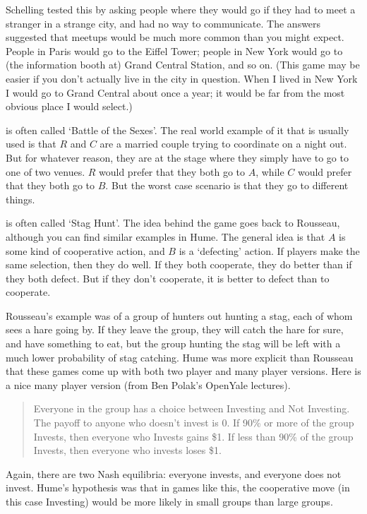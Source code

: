 Schelling tested this by asking people where they would go if they had to meet a stranger in a strange city, and had no way to communicate. The answers suggested that meetups would be much more common than you might expect. People in Paris would go to the Eiffel Tower; people in New York would go to (the information booth at) Grand Central Station, and so on. (This game may be easier if you don't actually live in the city in question. When I lived in New York I would go to Grand Central about once a year; it would be far from the most obvious place I would select.)

 is often called `Battle of the Sexes'. The real world example of it that is usually used is that $R$ and $C$ are a married couple trying to coordinate on a night out. But for whatever reason, they are at the stage where they simply have to go to one of two venues. $R$ would prefer that they both go to $A$, while $C$ would prefer that they both go to $B$. But the worst case scenario is that they go to different things.

 is often called `Stag Hunt'. The idea behind the game goes back to Rousseau, although you can find similar examples in Hume. The general idea is that $A$ is some kind of cooperative action, and $B$ is a `defecting' action. If players make the same selection, then they do well. If they both cooperate, they do better than if they both defect. But if they don't cooperate, it is better to defect than to cooperate.

Rousseau's example was of a group of hunters out hunting a stag, each of whom sees a hare going by. If they leave the group, they will catch the hare for sure, and have something to eat, but the group hunting the stag will be left with a much lower probability of stag catching. Hume was more explicit than Rousseau that these games come up with both two player and many player versions. Here is a nice many player version (from Ben Polak's OpenYale lectures).

\begin{quote}

Everyone in the group has a choice between Investing and Not Investing. The payoff to anyone who doesn't invest is 0. If 90\% or more of the group Invests, then everyone who Invests gains \$1. If less than 90\% of the group Invests, then everyone who invests loses \$1.
\end{quote}

\noindent Again, there are two Nash equilibria: everyone invests, and everyone does not invest. Hume's hypothesis was that in games like this, the cooperative move (in this case Investing) would be more likely in small groups than large groups.

